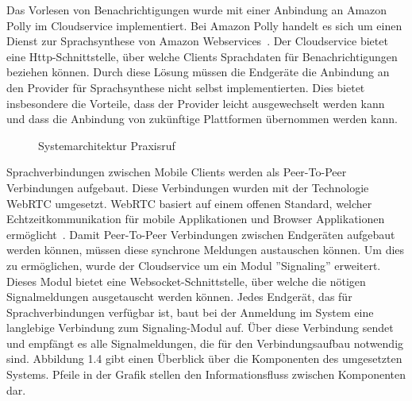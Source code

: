 Das Vorlesen von Benachrichtigungen wurde mit einer Anbindung an Amazon Polly im Cloudservice implementiert.
Bei Amazon Polly handelt es sich um einen Dienst zur Sprachsynthese von Amazon Webservices~\cite{aws_polly}.
Der Cloudservice bietet eine Http-Schnittstelle, über welche Clients Sprachdaten für Benachrichtigungen beziehen können.
Durch diese Lösung müssen die Endgeräte die Anbindung an den Provider für Sprachsynthese nicht selbst implementierten.
Dies bietet insbesondere die Vorteile, dass der Provider leicht ausgewechselt werden kann und dass die Anbindung von zukünftige Plattformen übernommen werden kann.

\begin{figure}[h]
    \centering
    \begin{minipage}[b]{0.7\textwidth}
        \caption{Systemarchitektur Praxisruf}
    \end{minipage}
\end{figure}

Sprachverbindungen zwischen Mobile Clients werden als Peer-To-Peer Verbindungen aufgebaut.
Diese Verbindungen wurden mit der Technologie WebRTC umgesetzt.
WebRTC basiert auf einem offenen Standard, welcher Echtzeitkommunikation für mobile Applikationen und Browser Applikationen ermöglicht~\cite{webrtc}.
Damit Peer-To-Peer Verbindungen zwischen Endgeräten aufgebaut werden können, müssen diese synchrone Meldungen austauschen können.
Um dies zu ermöglichen, wurde der Cloudservice um ein Modul ''Signaling'' erweitert.
Dieses Modul bietet eine Websocket-Schnittstelle, über welche die nötigen Signalmeldungen ausgetauscht werden können.
Jedes Endgerät, das für Sprachverbindungen verfügbar ist, baut bei der Anmeldung im System eine langlebige Verbindung zum Signaling-Modul auf.
Über diese Verbindung sendet und empfängt es alle Signalmeldungen, die für den Verbindungsaufbau notwendig sind.
Abbildung 1.4 gibt einen Überblick über die Komponenten des umgesetzten Systems.
Pfeile in der Grafik stellen den Informationsfluss zwischen Komponenten dar.

